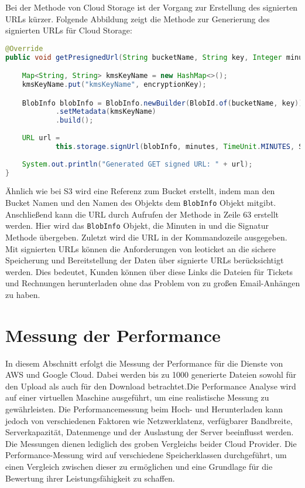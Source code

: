 \newpage

Bei der Methode von Cloud Storage ist der Vorgang zur Erstellung des signierten URLs kürzer. Folgende Abbildung zeigt die Methode zur Generierung des signierten URLs für Cloud Storage:

\begin{lstlisting}[language=Java, caption=Prototyp Code Snippet - Generierung eines signierten URLs durch GC]
@Override
public void getPresignedUrl(String bucketName, String key, Integer minutes, String encryptionKey) {

    Map<String, String> kmsKeyName = new HashMap<>();
    kmsKeyName.put("kmsKeyName", encryptionKey);

    BlobInfo blobInfo = BlobInfo.newBuilder(BlobId.of(bucketName, key))
            .setMetadata(kmsKeyName)
            .build();
    
    URL url =
            this.storage.signUrl(blobInfo, minutes, TimeUnit.MINUTES, Storage.SignUrlOption.withV4Signature());
    
    System.out.println("Generated GET signed URL: " + url);
}
\end{lstlisting}

Ähnlich wie bei S3 wird eine Referenz zum Bucket erstellt, indem man den Bucket Namen und den Namen des Objekts dem \verb|BlobInfo| Objekt mitgibt. Anschließend kann die URL durch Aufrufen der Methode in Zeile 63 erstellt werden. Hier wird das \verb|BlobInfo| Objekt, die Minuten in und die Signatur Methode übergeben. Zuletzt wird die URL in der Kommandozeile ausgegeben.\\

Mit signierten URLs können die Anforderungen von leoticket an die sichere Speicherung und Bereitstellung der Daten über signierte URLs berücksichtigt werden. Dies bedeutet, Kunden können über diese Links die Dateien für Tickets und Rechnungen herunterladen ohne das Problem von zu großen Email-Anhängen zu haben.\\

\newpage

\section{Messung der Performance}

In diesem Abschnitt erfolgt die Messung der Performance für die Dienste von AWS und Google Cloud. Dabei werden bis zu 1000 generierte Dateien sowohl für den Upload als auch für den Download betrachtet.Die Performance Analyse wird auf einer virtuellen Maschine ausgeführt, um eine realistische Messung zu gewährleisten. Die Performancemessung beim Hoch- und Herunterladen kann jedoch von verschiedenen Faktoren wie Netzwerklatenz, verfügbarer Bandbreite, Serverkapazität, Datenmenge und der Auslastung der Server beeinflusst werden. Die Messungen dienen lediglich des groben Vergleichs beider Cloud Provider. Die Performance-Messung wird auf verschiedene Speicherklassen durchgeführt, um einen Vergleich zwischen dieser zu ermöglichen und eine Grundlage für die Bewertung ihrer Leistungsfähigkeit zu schaffen.\\


